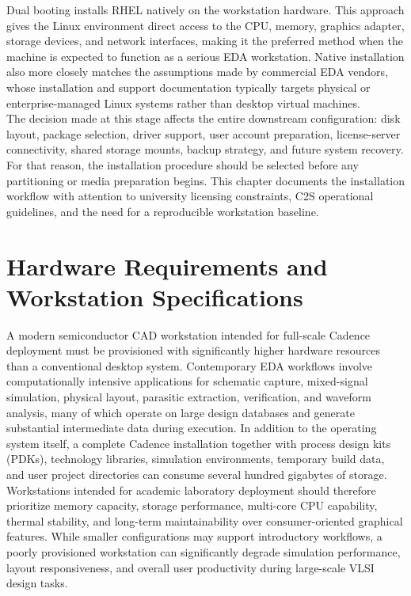 Dual booting installs RHEL natively on the workstation hardware. This approach gives the Linux
environment direct access to the CPU, memory, graphics adapter, storage devices, and network
interfaces, making it the preferred method when the machine is expected to function as a serious
EDA workstation. Native installation also more closely matches the assumptions made by commercial
EDA vendors, whose installation and support documentation typically targets physical or
enterprise-managed Linux systems rather than desktop virtual machines.\\

The decision made at this stage affects the entire downstream configuration: disk layout, package
selection, driver support, user account preparation, license-server connectivity, shared storage
mounts, backup strategy, and future system recovery. For that reason, the installation procedure
should be selected before any partitioning or media preparation begins. This chapter documents
the installation workflow with attention to university licensing constraints, C2S operational
guidelines, and the need for a reproducible workstation baseline. \\




\section{Hardware Requirements and Workstation Specifications}
A modern semiconductor CAD workstation intended for full-scale Cadence deployment must be provisioned with significantly higher hardware resources than a conventional desktop system. Contemporary EDA workflows involve computationally intensive applications for schematic capture, mixed-signal simulation, physical layout, parasitic extraction, verification, and waveform analysis, many of which operate on large design databases and generate substantial intermediate data during execution. In addition to the operating system itself, a complete Cadence installation together with process design kits (PDKs), technology libraries, simulation environments, temporary build data, and user project directories can consume several hundred gigabytes of storage. \\

Workstations intended for academic laboratory deployment should therefore prioritize memory capacity, storage performance, multi-core CPU capability, thermal stability, and long-term maintainability over consumer-oriented graphical features. While smaller configurations may support introductory workflows, a poorly provisioned workstation can significantly degrade simulation performance, layout responsiveness, and overall user productivity during large-scale VLSI design tasks.\\


